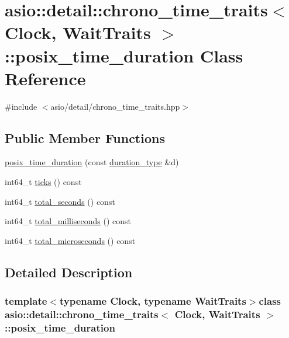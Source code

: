 \hypertarget{classasio_1_1detail_1_1chrono__time__traits_1_1posix__time__duration}{}\section{asio\+:\+:detail\+:\+:chrono\+\_\+time\+\_\+traits$<$ Clock, Wait\+Traits $>$\+:\+:posix\+\_\+time\+\_\+duration Class Reference}
\label{classasio_1_1detail_1_1chrono__time__traits_1_1posix__time__duration}


{\ttfamily \#include $<$asio/detail/chrono\+\_\+time\+\_\+traits.\+hpp$>$}

\subsection*{Public Member Functions}
\begin{DoxyCompactItemize}
\item 
\hyperlink{classasio_1_1detail_1_1chrono__time__traits_1_1posix__time__duration_a87bbe340a24639ed5cefd2c47766bac2}{posix\+\_\+time\+\_\+duration} (const \hyperlink{structasio_1_1detail_1_1chrono__time__traits_a7f122a7cb603e7516bb6595016960775}{duration\+\_\+type} \&d)
\item 
int64\+\_\+t \hyperlink{classasio_1_1detail_1_1chrono__time__traits_1_1posix__time__duration_a6825817d67e57a579a4e468b5251822c}{ticks} () const 
\item 
int64\+\_\+t \hyperlink{classasio_1_1detail_1_1chrono__time__traits_1_1posix__time__duration_a04cfcff494f7f1dda157926ac6f7449d}{total\+\_\+seconds} () const 
\item 
int64\+\_\+t \hyperlink{classasio_1_1detail_1_1chrono__time__traits_1_1posix__time__duration_a2e09f7fedd8968ef2c2320cac8500517}{total\+\_\+milliseconds} () const 
\item 
int64\+\_\+t \hyperlink{classasio_1_1detail_1_1chrono__time__traits_1_1posix__time__duration_aeabc313b8ed051b67aec1ff8194586c5}{total\+\_\+microseconds} () const 
\end{DoxyCompactItemize}


\subsection{Detailed Description}
\subsubsection*{template$<$typename Clock, typename Wait\+Traits$>$class asio\+::detail\+::chrono\+\_\+time\+\_\+traits$<$ Clock, Wait\+Traits $>$\+::posix\+\_\+time\+\_\+duration}



